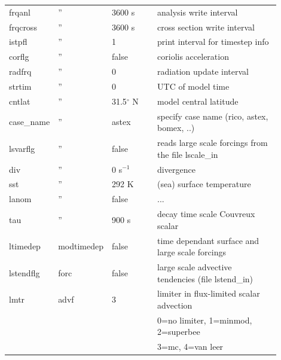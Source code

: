 \documentclass[11pt,a4paper]{article}
\begin{document}
\begin{longtable}[htb]{p{0.12\linewidth}p{0.1\linewidth}p{0.18\linewidth}p{0.5\linewidth}}
frqanl       &  ''  & 3600 s              & analysis write interval                               \\
frqcross     &  ''  & 3600 s              & cross section write interval                          \\
istpfl       &  ''  & 1                   & print interval for timestep info                      \\
corflg       &  ''  & false               & coriolis acceleration                                 \\
radfrq       &  ''  & 0                   & radiation update interval                             \\
strtim       &  ''  & 0                   & UTC of model time                                     \\
cntlat       &  ''  & 31.5$^{\circ}$ N    & model central latitude                                \\
case\_name   &  ''  & astex               & specify case name (rico, astex, bomex, ..)            \\
lsvarflg     &  ''  & false               & reads large scale forcings from the file lscale\_in   \\
div          &  ''  & 0 s$^{-1}$          & divergence                                            \\
sst          &  ''  & 292 K               & (sea) surface temperature                             \\ 
lanom        &  ''  & false               & ...                                                   \\
tau          &  ''  & 900 s               & decay time scale Couvreux scalar                      \\
\hline
ltimedep     & modtimedep & false         & time dependant surface and large scale forcings       \\ 
\hline
lstendflg    & forc & false               & large scale advective tendencies (file lstend\_in)    \\
\hline
lmtr         & advf & 3                   & limiter in flux-limited scalar advection              \\ 
             &      &                     & \hspace{2mm} 0=no limiter, 1=minmod, 2=superbee       \\
             &      &                     & \hspace{2mm} 3=mc, 4=van leer                         \\

\end{longtable}
\end{document}
